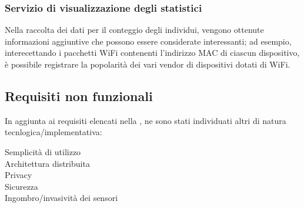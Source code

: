 \subsubsection{Servizio di visualizzazione degli statistici}

Nella raccolta dei dati per il conteggio degli individui, vengono ottenute informazioni aggiuntive che possono essere considerate interessanti;
ad esempio, interecettando i pacchetti WiFi contenenti l'indirizzo MAC di ciascun dispositivo, è possibile registrare la popolarità dei vari vendor di dispositivi dotati di WiFi.

\subsection{Requisiti non funzionali}

In aggiunta ai requisiti elencati nella , ne sono stati individuati altri di natura tecnlogica/implementativa:

\begin{description}
  \item[Semplicità di utilizzo]
  \item[Architettura distribuita]
  \item[Privacy]
  \item[Sicurezza]
  \item[Ingombro/invasività dei sensori]
\end{description}
